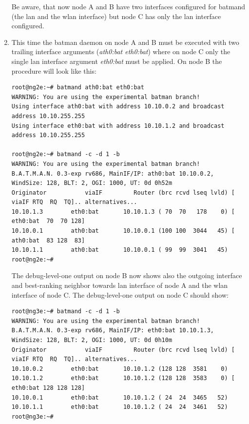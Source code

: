 \documentclass[11pt]{article}
\begin{document}
\begin{enumerate}
Be aware, that now node A and B have two interfaces configured for batmand (the lan and the wlan interface) but node C has only the lan interface configured.

\item This time the batman daemon on node A and B must be executed with two trailing interface arguments (\emph{ath0:bat eth0:bat}) where on node C only the single lan interface argument \emph{eth0:bat} must be applied. 
On node B the procedure will look like this:

\begin{small} \begin{verbatim}
root@ng2e:~# batmand ath0:bat eth0:bat
WARNING: You are using the experimental batman branch!
Using interface ath0:bat with address 10.10.0.2 and broadcast address 10.10.255.255
Using interface eth0:bat with address 10.10.1.2 and broadcast address 10.10.255.255

root@ng2e:~# batmand -c -d 1 -b
WARNING: You are using the experimental batman branch!
B.A.T.M.A.N. 0.3-exp rv686, MainIF/IP: ath0:bat 10.10.0.2, WindSize: 128, BLT: 2, OGI: 1000, UT: 0d 0h52m
Originator           viaIF         Router (brc rcvd lseq lvld) [    viaIF RTQ  RQ  TQ].. alternatives...
10.10.1.3        eth0:bat       10.10.1.3 ( 70  70   178    0) [ eth0:bat  70  70 128]
10.10.0.1        ath0:bat       10.10.0.1 (100 100  3044   45) [ ath0:bat  83 128  83]
10.10.1.1        ath0:bat       10.10.0.1 ( 99  99  3041   45)
root@ng2e:~#  
\end{verbatim} \end{small}

The debug-level-one output on node B now shows also the outgoing interface and best-ranking neighbor towards lan interface of node A and the wlan interface of node C.
The debug-level-one output on node C should show:
\begin{small} \begin{verbatim}
root@ng3e:~# batmand -c -d 1 -b
WARNING: You are using the experimental batman branch!
B.A.T.M.A.N. 0.3-exp rv686, MainIF/IP: eth0:bat 10.10.1.3, WindSize: 128, BLT: 2, OGI: 1000, UT: 0d 0h10m
Originator           viaIF         Router (brc rcvd lseq lvld) [    viaIF RTQ  RQ  TQ].. alternatives...
10.10.0.2        eth0:bat       10.10.1.2 (128 128  3581    0)
10.10.1.2        eth0:bat       10.10.1.2 (128 128  3583    0) [ eth0:bat 128 128 128]
10.10.0.1        eth0:bat       10.10.1.2 ( 24  24  3465   52)
10.10.1.1        eth0:bat       10.10.1.2 ( 24  24  3461   52)
root@ng3e:~#
\end{verbatim} \end{small}


\end{enumerate}
\end{document}
